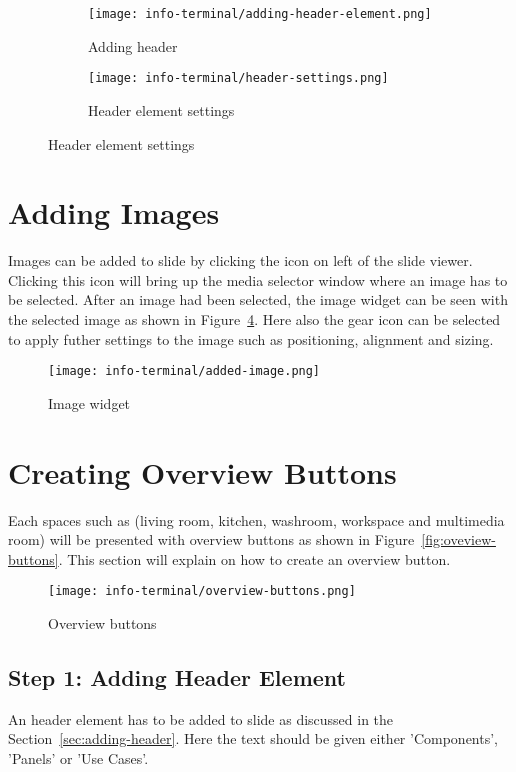 \begin{figure}[ht]
	\begin{subfigure}{.49\textwidth}
	\caption{Adding header}
	\label{fig:info-terminal-adding-header-text}
	\centering
	\texttt{[image: info-terminal/adding-header-element.png]}
	\end{subfigure}
	\begin{subfigure}{.49\textwidth}
	\caption{Header element settings}
	\label{fig:info-terminal-header-settings}
	\centering
	\texttt{[image: info-terminal/header-settings.png]}
	\end{subfigure}
\end{figure}

\section{Adding Images}
Images can be added to slide by clicking the  icon on left of the slide viewer. Clicking this icon will bring up the media selector window where an image has to be selected. After an image had been selected, the image widget can be seen with the selected image as shown in Figure~\ref{fig:image-widget}. Here also the gear icon can be selected to apply futher settings to the image such as positioning, alignment and sizing.

\begin{figure}[ht]
\caption{Image widget}
\label{fig:image-widget}
\centering
\texttt{[image: info-terminal/added-image.png]}
\end{figure}

\section{Creating Overview Buttons}
Each spaces such as (living room, kitchen, washroom, workspace and multimedia room) will be presented with overview buttons as shown in Figure~\ref{fig:oveview-buttons}. This section will explain on how to create an overview button.

\begin{figure}[ht]
\caption{Overview buttons}
\label{fig:overview-button}
\centering
\texttt{[image: info-terminal/overview-buttons.png]}
\end{figure}

\subsection*{Step 1: Adding Header Element}
An header element has to be added to slide as discussed in the Section~\ref{sec:adding-header}. Here the text should be given either 'Components', 'Panels' or 'Use Cases'. 

